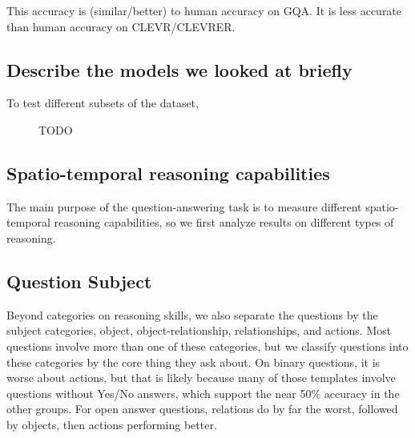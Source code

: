 \documentclass[10pt,twocolumn,letterpaper]{article}
\newcommand{\mgm}[1]{{\color{cyan}{mgm: #1}}}
\begin{document}
This accuracy is (similar/better) to human accuracy on GQA. It is less accurate than human accuracy on CLEVR/CLEVRER. 

\mgm{Get numbers}

\subsection{Describe the models we looked at briefly}

To test different subsets of the dataset, 

\mgm{Is it necessary to do this? CLEVR did, GQA did not}
%

\begin{figure}[t]
\begin{center}
\resizebox{\linewidth}{!}{

}
\end{center}
   \caption{TODO}
\label{global results}
\end{figure}



\subsection{Spatio-temporal reasoning capabilities}
The main purpose of the question-answering task is to measure different spatio-temporal reasoning capabilities, so we first analyze results on different types of reasoning. 

\textbf{}
\subsection{Question Subject}

Beyond categories on reasoning skills, we also separate the questions by the subject categories, object, object-relationship, relationships, and actions. Most questions involve more than one of these categories, but we classify questions into these categories by the core thing they ask about. On binary questions, it is worse about actions, but that is likely because many of those templates involve questions without Yes/No answers, which support the near 50\% accuracy in the other groups. For open answer questions, relations do by far the worst, followed by objects, then actions performing better. 
\end{document}
